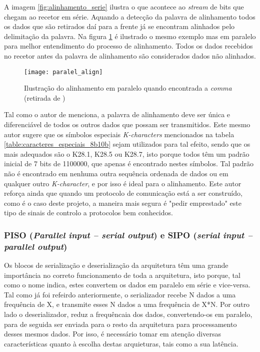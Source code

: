 A imagem \ref{fig:alinhamento_serie} ilustra o que acontece ao \textit{stream} de bits que chegam ao recetor em série. Aquando a detecção da palavra de alinhamento todos os dados que são retirados daí para a frente já se encontram alinhados pelo delimitação da palavra. Na figura \ref{fig:alinhamento_paralelo} é ilustrado o mesmo exemplo mas em paralelo para melhor entendimento do processo de alinhamento. Todos os dados recebidos no recetor antes da palavra de alinhamento são considerados dados não alinhados.

\begin{figure}[h!]
	\begin{center}
		\leavevmode
		\texttt{[image: paralel\_align]}
		\caption[Ilustração do alinhamento em paralelo quando encontrada a \textit{comma}]{Ilustração do alinhamento em paralelo quando encontrada a \textit{comma} (retirada de \cite{R011})}
		\label{fig:alinhamento_paralelo}
	\end{center}
\end{figure}

Tal como o autor de \cite{R032} menciona, a palavra de alinhamento deve ser única e diferenciável de todos os outros dados que possam ser transmitidos. Este mesmo autor sugere que os símbolos especiais \textit{K-characters} mencionados na tabela \ref{table:caracteres_especiais_8b10b} sejam utilizados para tal efeito, sendo que os mais adequados são o K28.1, K28.5 ou K28.7, isto porque todos têm um padrão inicial de 7 bits de 1100000, que apenas é encontrado nestes símbolos. Tal padrão não é encontrado em nenhuma outra sequência ordenada de dados ou em qualquer outro \textit{K-character}, e por isso é ideal para o alinhamento. Este autor reforça ainda que quando um protocolo de comunicação está a ser construído, como é o caso deste projeto, a maneira mais segura é "pedir emprestado" este tipo de sinais de controlo a protocolos bem conhecidos.



\subsubsection*{PISO (\textit{Parallel input – serial output}) e SIPO (\textit{serial input – parallel output})}

Os blocos de serialização e deserialização da arquitetura têm uma grande importância no correto funcionamento de toda a arquitetura, isto porque, tal como o nome indica, estes convertem os dados em paralelo em série e vice-versa. Tal como já foi refeirdo anteriormente, o serializador recebe N dados a uma frequência de X, e transmite esses N dados a uma frequência de X*N. Por outro lado o deserializador, reduz a frequêncaia dos dados, convertendo-os em paralelo, para de seguida ser enviada para o resto da arquitetura para processamento desses mesmos dados. Por isso, é necessário tomar em atenção diversas características quanto à escolha destas arquieturas, tais como a sua latência.

